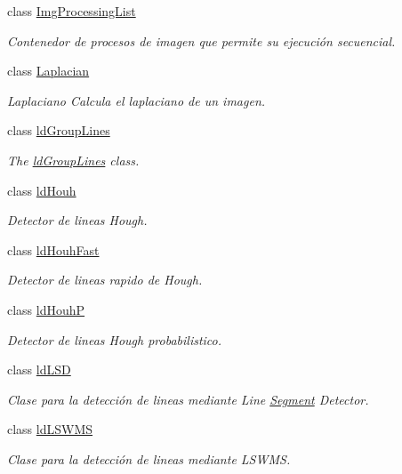 \begin{DoxyCompactItemize}
class \hyperlink{class_i3_d_1_1_img_processing_list}{Img\+Processing\+List}
\begin{DoxyCompactList}\small\item\em Contenedor de procesos de imagen que permite su ejecución secuencial. \end{DoxyCompactList}\item 
class \hyperlink{class_i3_d_1_1_laplacian}{Laplacian}
\begin{DoxyCompactList}\small\item\em Laplaciano Calcula el laplaciano de un imagen. \end{DoxyCompactList}\item 
class \hyperlink{class_i3_d_1_1ld_group_lines}{ld\+Group\+Lines}
\begin{DoxyCompactList}\small\item\em The \hyperlink{class_i3_d_1_1ld_group_lines}{ld\+Group\+Lines} class. \end{DoxyCompactList}\item 
class \hyperlink{class_i3_d_1_1ld_houh}{ld\+Houh}
\begin{DoxyCompactList}\small\item\em Detector de lineas Hough. \end{DoxyCompactList}\item 
class \hyperlink{class_i3_d_1_1ld_houh_fast}{ld\+Houh\+Fast}
\begin{DoxyCompactList}\small\item\em Detector de lineas rapido de Hough. \end{DoxyCompactList}\item 
class \hyperlink{class_i3_d_1_1ld_houh_p}{ld\+HouhP}
\begin{DoxyCompactList}\small\item\em Detector de lineas Hough probabilistico. \end{DoxyCompactList}\item 
class \hyperlink{class_i3_d_1_1ld_l_s_d}{ld\+L\+SD}
\begin{DoxyCompactList}\small\item\em Clase para la detección de lineas mediante Line \hyperlink{class_i3_d_1_1_segment}{Segment} Detector. \end{DoxyCompactList}\item 
class \hyperlink{class_i3_d_1_1ld_l_s_w_m_s}{ld\+L\+S\+W\+MS}
\begin{DoxyCompactList}\small\item\em Clase para la detección de lineas mediante L\+S\+W\+MS. \end{DoxyCompactList}\item 

\end{DoxyCompactItemize}
